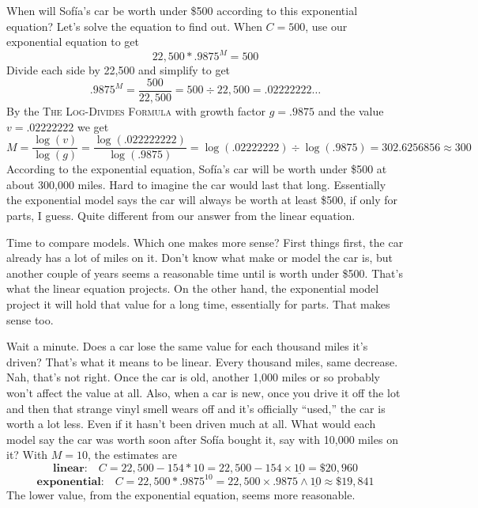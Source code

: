 When will Sof\'{i}a's car be worth under \$500 according to this exponential equation?  Let's solve the equation to find out.  When $C=500$, use our exponential equation to get  %
$$ 22,500 \ast .9875^M =500$$
Divide each side by 22,500 and simplify to get
$$.9875^M= \frac{500}{22,500} = 500 \div 22,500 = .02222222\ldots$$
By the \textsc{The Log-Divides Formula} with growth factor $g=.9875$ and the value $v= .02222222$ we get 
$$M =  \frac{\log (v)}{\log(g)}=  \frac{\log (.022222222)}{\log(.9875)} =  \log (.02222222) \div \log (.9875) = 302.6256856 \approx 300$$
According to the exponential equation, Sof\'{i}a's car will be worth under \$500 at about 300,000 miles.  Hard to imagine the car would last that long.  Essentially the exponential model says the car will always be worth at least \$500, if only for parts, I guess.  Quite different from our answer from the linear equation.

Time to compare models.  Which one makes more sense?  First things first, the car already has a lot of miles on it.  Don't know what make or model the car is, but another couple of years seems a reasonable time until is worth under \$500.  That's what the linear  equation projects.  On the other hand, the exponential model project it will hold that value for a long time, essentially for parts.  That makes sense too.

Wait a minute.  Does a car lose the same value for each thousand miles it's driven?  That's what it means to be linear. Every thousand miles, same decrease.  Nah, that's not right.  Once the car is old, another 1,000 miles or so probably won't affect the value at all. Also, when a car is new, once you drive it off the lot and then that strange vinyl smell wears off and it's officially ``used,'' the car is worth a lot less.  Even if it hasn't been driven much at all. What would each model say the car was worth soon after Sof\'{i}a bought it, say with 10,000 miles on it? With $M=10$, the estimates are
 $$\textbf{linear:} \quad C =  22,500 - 154 \ast 10 = 22,500 - 154 \times \underline{10} = \$20,960$$ 
$$\textbf{exponential:} \quad C=  22,500 \ast .9875^{10}=  22,500 \times .9875 \wedge\underline{10}
 \approx \$19,841$$
The lower value, from the exponential equation, seems more reasonable.


